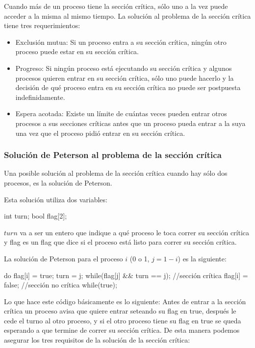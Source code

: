 \documentclass{article}
\begin{document}
Cuando m\'as de un proceso tiene la secci\'on cr\'itica, s\'olo uno a la vez puede acceder a la misma al mismo tiempo. La soluci\'on al problema de la secci\'on cr\'itica tiene tres requerimientos:

\begin{itemize}
\item Exclusi\'on mutua: Si un proceso entra a su secci\'on cr\'itica, ning\'un otro proceso puede estar en su secci\'on cr\'itica.
\item Progreso: Si ning\'un proceso est\'a ejecutando su secci\'on cr\'itica y algunos procesos quieren entrar en su secci\'on cr\'itica, s\'olo uno puede hacerlo y la decisi\'on de qu\'e proceso entra en su secci\'on cr\'itica no puede ser postpuesta indefinidamente.
\item Espera acotada: Existe un l\'imite de cu\'antas veces pueden entrar otros procesos a sus secciones cr\'iticas antes que un proceso pueda entrar a la suya una vez que el proceso pidi\'o entrar en su secci\'on cr\'itica.
\end{itemize}

\subsubsection{Soluci\'on de Peterson al problema de la secci\'on cr\'itica}

Una posible soluci\'on al problema de la secci\'on cr\'itica cuando hay s\'olo dos procesos, es la soluci\'on de Peterson.

Esta soluci\'on utiliza dos variables:

\begin{code}
int turn;
bool flag[2];
\end{code}

$turn$ va a ser un entero que indique a qu\'e proceso le toca correr su secci\'on cr\'itica y flag es un flag que dice si el proceso est\'a listo para correr su secci\'on cr\'itica.

La soluci\'on de Peterson para el proceso $i$ (0 o 1, $j = 1-i$) es la siguiente:

\begin{code}
do{
    flag[i] = true;
		turn = j;
		while(flag[j] && turn == j);
		//sección crítica
		flag[i] = false;
		//sección no crítica
}while(true);
\end{code}

Lo que hace este c\'odigo b\'asicamente es lo siguiente: Antes de entrar a la secci\'on cr\'itica un proceso avisa que quiere entrar seteando su flag en true, despu\'es le cede el turno al otro proceso, y si el otro proceso tiene su flag en true se queda esperando a que termine de correr su secci\'on cr\'itica. De esta manera podemos asegurar los tres requisitos de la soluci\'on de la secci\'on cr\'itica:
\end{document}
